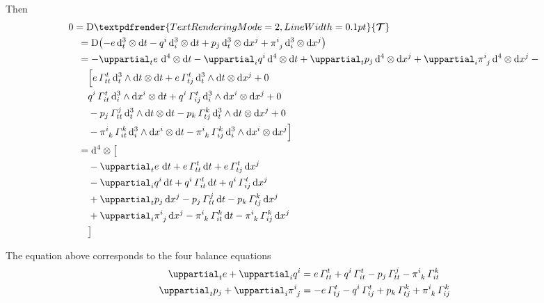 \documentclass[\ifafour a4paper,12pt,\else a5paper,10pt,\fi%
onecolumn,oneside,article,%
british%
]{memoir}
\theoremstyle{remark}
\theoremstyle{innote}
\renewcommand*{\bm}[1]{\textpdfrender{TextRenderingMode=2,LineWidth=0.1pt}{\boldsymbol{#1}}}
\newcommand*{\de}{\uppartial}%
\newcommand*{\di}{\mathrm{d}}%
\newcommand*{\Di}{\mathrm{D}}%
\renewcommand*{\|}[1][]{\nonscript\:#1\vert\nonscript\:\mathopen{}}
\renewcommand*{\i}{{}\indices}
\newcommand*{\si}[1]{\di{#1}}
\newcommand*{\ttti}[1]{\di^{3}_{#1}}
\newcommand*{\tttti}[1]{\di^{4}_{#1}}
\newcommand*{\yTT}{\bm{\mathcal{T}}}
\begin{document}
Then
\begin{equation}
  \label{eq:div_T31}
  \begin{aligned}
    &0=\Di\yTT
    \\
    &\quad{}= \Di\bigl(
    -e\, \ttti{t}\otimes\si{t}
    -q^{i}\, \ttti{i}\otimes\si{t}
    +p_{j}\, \ttti{t}\otimes\si{x^{j}}
    +\pi\i{^{i}_{j}}\, \ttti{i}\otimes\si{x^{j}}
    \bigr)
    \\
    &\quad{}=
    -\de_{t}e\ \tttti{}\otimes\si{t}
    -\de_{i}q^{i}\, \tttti{}\otimes\si{t}
    +\de_{t}p_{j}\, \tttti{}\otimes\si{x^{j}}
    +\de_{i}\pi\i{^{i}_{j}}\, \tttti{}\otimes\si{x^{j}}
    -{}
    \\
    &\qquad
    \Bigl[
    e\,\varGamma^{t}_{tt}\, \ttti{t}\land\si{t} \otimes \si{t}
    +e\,\varGamma^{t}_{tj}\, \ttti{t}\land\si{t} \otimes \si{x^{j}}
    + 0
    \\
    &\qquad
    q^{i}\, \varGamma^{t}_{it}\, \ttti{i}\land\si{x^{i}} \otimes \si{t}
    +q^{i}\,\varGamma^{t}_{ij}\, \ttti{i}\land\si{x^{i}} \otimes \si{x^{j}}
    + 0
    \\
    &\qquad
    {}-p_{j}\, \varGamma^{j}_{tt}\, \ttti{t}\land\si{t} \otimes \si{t}
    -p_{k}\,\varGamma^{k}_{tj}\, \ttti{t}\land\si{t} \otimes \si{x^{j}}
    + 0
    \\
    &\qquad
    {}-\pi\i{^{i}_{k}}\, \varGamma^{k}_{it}\, \ttti{i}\land\si{x^{i}} \otimes \si{t}
    -\pi\i{^{i}_{k}}\,\varGamma^{k}_{ij}\, \ttti{i}\land\si{x^{i}} \otimes \si{x^{j}}
    \Bigr]
    \\
    &\quad{}=
    \tttti{}\otimes \bigl[{}
    \\
    &\qquad
    -\de_{t}e\ \si{t} 
    + e\,\varGamma^{t}_{tt}\, \si{t}
    +e\,\varGamma^{t}_{tj}\,  \si{x^{j}}
    \\
    &\qquad
    {}-\de_{i}q^{i}\, \si{t} 
    +q^{i}\, \varGamma^{t}_{it}\,  \si{t}
    +q^{i}\,\varGamma^{t}_{ij}\,  \si{x^{j}}
    \\
    &\qquad
    {}+\de_{t}p_{j}\, \si{x^{j}} 
    -p_{j}\, \varGamma^{j}_{tt}\, \si{t}
    -p_{k}\,\varGamma^{k}_{tj}\,  \si{x^{j}}
    \\
    &\qquad
    {}+\de_{i}\pi\i{^{i}_{j}}\, \si{x^{j}} 
    -\pi\i{^{i}_{k}}\, \varGamma^{k}_{it}\, \si{t}
    -\pi\i{^{i}_{k}}\,\varGamma^{k}_{ij}\, \si{x^{j}}
    \\
    &\qquad{}\bigr]
  \end{aligned}
\end{equation}

The equation above corresponds to the four balance equations
\begin{align}
  \label{eq:div_e}
  \de_{t}e + \de_{i}q^{i} &=
  e\,\varGamma^{t}_{tt}
  +q^{i}\, \varGamma^{t}_{it}
  -p_{j}\, \varGamma^{j}_{tt}
  -\pi\i{^{i}_{k}}\, \varGamma^{k}_{it}
  \\
  \label{eq:div_p}
  \de_{t}p_{j} +  \de_{i}\pi\i{^{i}_{j}} &=
  -e\,\varGamma^{t}_{tj}
  -q^{i}\,\varGamma^{t}_{ij}
  +p_{k}\,\varGamma^{k}_{tj}
  +\pi\i{^{i}_{k}}\,\varGamma^{k}_{ij}
\end{align}
\end{document}
